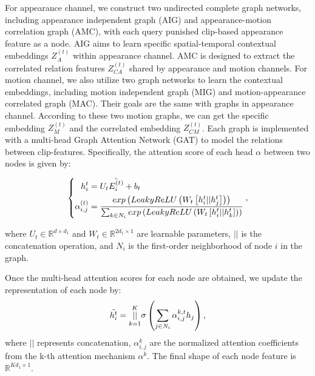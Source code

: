 \documentclass[journal]{IEEEtran}
\begin{document}
For appearance channel, we construct two undirected complete graph networks, including appearance independent graph (AIG) and appearance-motion correlation graph (AMC), with each query punished clip-based appearance feature as a node. AIG aims to learn specific spatial-temporal contextual embeddings $Z_A^{\left(t\right)}$ within appearance channel. AMC is designed to extract the correlated relation features $Z_{CA}^{\left(t\right)}$ shared by appearance and motion channels. For motion channel, we also utilize two graph networks to learn the contextual embeddings, including motion independent graph (MIG) and motion-appearance correlated graph (MAC). Their goals are the same with graphs in appearance channel. According to these two motion graphs, we can get the specific embedding $Z_M^{\left(t\right)}$ and the correlated embedding $Z_{CM}^{\left(t\right)}$. Each graph is implemented with a multi-head Graph Attention Network (GAT) to model the relations between clip-features. Specifically, the attention score of each head $\alpha$ between two nodes is given by:

\begin{equation}
\left\{
    \begin{aligned}
        h^{t}_i & = U_t \Tilde{E^{\left(t\right)}_i} + b_t\\
        \alpha_{i,j}^{\left(t\right)} & = \frac{exp\left(LeakyReLU\left(W_t\left[h^{t}_i||h^{t}_j\right]\right)\right)}{\sum_{k \in N_i} exp\left(LeakyReLU\left(W_t\left[h^{t}_i||h^{t}_k\right]\right)\right)}
    \end{aligned}
    \right.,
\end{equation}

where $U_t \in \mathbb{R}^{d \times d_1}$ and $W_t \in 
\mathbb{R}^{2d_1 \times 1}$ are learnable parameters, $||$ is the concatenation operation, and $N_i$ is the first-order neighborhood of node $i$ in the graph.

Once the multi-head attention scores for each node are obtained, we update the representation of each node by:
\begin{equation}
    \begin{aligned}
        \Tilde{h^{t}_i} & = \overset{K}{\underset{k=1}{||}} \sigma \left(\sum_{j \in N_i} \alpha_{i,j}^{k,t}h_j\right),\\
    \end{aligned}
\end{equation}
where $||$ represents concatenation, $\alpha_{i,j}^k$ are the normalized attention coefficients from the k-th attention mechanism $\alpha^k$. The final shape of each node feature is $\mathbb{R}^{Kd_1 \times 1}$. 
\end{document}
